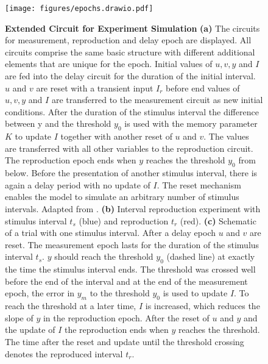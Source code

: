 \documentclass[9pt]{article}
\begin{document}
\begin{figure}
	\centering
	\texttt{[image: figures/epochs.drawio.pdf]}
	\caption{\textbf{Extended Circuit for Experiment Simulation} 
	\textbf{(a)} The circuits for measurement, reproduction and delay epoch are displayed. All circuits comprise the same basic structure with different additional elements that are unique for the epoch. Initial values of $u, v, y$ and $I$ are fed into the delay circuit for the duration of the initial interval. $u$ and $v$ are reset with a transient input $I_r$ before end values of $u, v, y$ and $I$ are transferred to the measurement circuit as new initial conditions. After the duration of the stimulus interval the difference between y and the threshold $y_0$ is used with the memory parameter $K$ to update $I$ together with another reset of $u$ and $v$. The values are transferred with all other variables to the reproduction circuit. The reproduction epoch ends when $y$ reaches the threshold $y_0$ from below. Before the presentation of another stimulus interval, there is again a delay period with no update of $I$. The reset mechanism enables the model to simulate an arbitrary number of stimulus intervals. Adapted from \cite{Petzschner2015}.
	\textbf{(b)} Interval reproduction experiment with stimulus interval $t_s$ (blue) and reproduction $t_r$ (red).
	\textbf{(c)} Schematic of a trial with one stimulus interval. After a delay epoch $u$ and $v$ are reset. The measurement epoch lasts for the duration of the stimulus interval $t_s$. $y$ should reach the threshold $y_0$ (dashed line) at exactly the time the stimulus interval ends. The threshold was crossed well before the end of the interval and at the end of the measurement epoch, the error in $y_m$ to the threshold $y_0$ is used to update $I$. To reach the threshold at a later time, $I$ is increased, which reduces the slope of $y$ in the reproduction epoch. After the reset of $u$ and $y$ and the update of $I$ the reproduction ends when $y$ reaches the threshold. The time after the reset and update until the threshold crossing denotes the reproduced interval $t_r$.}
\label{fig:epochs}
\end{figure}
\end{document}
